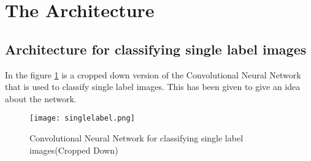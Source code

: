 \section{The Architecture}\label{sec:SysArchi}

\subsection{Architecture for classifying single label images}
In the figure \ref{singlelabel} is a cropped down version of the Convolutional Neural Network that is used to classify single label images. This has been given to give an idea about the network.

\begin{figure}[h!]
  \centering
  \texttt{[image: singlelabel.png]}
  \caption{Convolutional Neural Network for classifying single label images(Cropped Down)} \label{singlelabel}
\end{figure}

